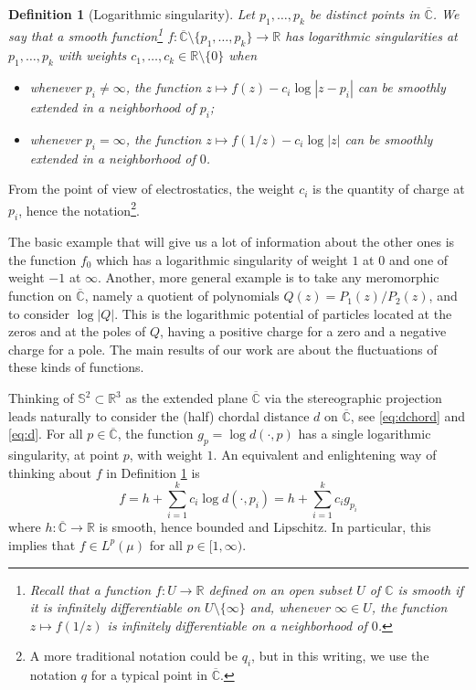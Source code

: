 \documentclass[10pt,reqno]{amsart}
\numberwithin{equation}{section}
\numberwithin{figure}{section}
\theoremstyle{plain}
\newtheorem{definition}[theorem]{Definition}
\newcommand{\<}{\langle}
\renewcommand{\>}{\rangle}
\begin{document}
\begin{definition}[Logarithmic singularity]\label{df:main:LogSing}
	Let $p_1,\dots,p_k$ be distinct points in $\overline{\mathbb C}$.
	We say that a smooth 
    function\footnote{Recall that a function
    $f: U \to \mathbb R$ 
    defined on an open subset $U$ of $\mathbb C$ is
    smooth if it is
    infinitely differentiable on $U \setminus \{\infty\}$
    and, whenever $\infty \in U$, 
    the function $z \mapsto f(1/z)$ is infinitely
    differentiable
    on a neighborhood of $0$.}
	$f:\overline{\mathbb C} \setminus \{p_1,\dots,p_k\} \to \mathbb{R}$ has logarithmic singularities at $p_1,\dots,p_k$  with weights $c_1,\dots,c_k \in \mathbb R \setminus \{0\}$ when
	\begin{itemize}
    \item whenever $p_i\neq\infty$, the function $z \mapsto f(z) - c_i\log|z-p_i|$ can be smoothly extended in a neighborhood of $p_i$;
	\item whenever $p_i=\infty$, the function $z \mapsto f(1/z) - c_i \log|z|$ can be smoothly extended in a neighborhood of $0$.
	\end{itemize}
\end{definition}

From the point of view of electrostatics, the weight $c_i$ is the quantity of charge at $p_i$, hence the notation\footnote{A more traditional notation could be $q_i$, but in this writing, we use the notation $q$ for a typical point in $\overline{\mathbb{C}}$.}. 

The basic example that will give us a lot of information about the other ones is the function $f_0$ which has a logarithmic singularity of weight $1$ at $0$ and one of weight $-1$ at $\infty$. Another, more general example is to take any meromorphic function on $\overline {\mathbb C}$, namely a quotient of polynomials $Q(z) = P_1(z)/P_2(z)$, and to consider $\log|Q|$. This is the logarithmic potential of particles located at the zeros and at the poles of $Q$, having a positive charge for a zero and a negative charge for a pole. The main results of our work are about the fluctuations of these kinds of functions.

Thinking of $\mathbb S^2\subset\mathbb{R}^3$ as the extended plane $\overline{\mathbb C}$ via the stereographic projection leads naturally to consider the (half) chordal distance $d$ on $\overline{\mathbb{C}}$, see \eqref{eq:dchord} and \eqref{eq:d}. For all $p\in\overline{\mathbb{C}}$, the function $g_p=\log d(\cdot,p)$ has a single logarithmic singularity, at point $p$, with weight $1$. An equivalent and enlightening way of thinking about $f$ in Definition \ref{df:main:LogSing} is 
\begin{equation}\label{eq:LogSingAlt}
    f=h+\sum_{i=1}^kc_i\log d(\cdot,p_i)
    =h+\sum_{i=1}^kc_ig_{p_i}
\end{equation}
where $h:\overline{\mathbb{C}}\to\mathbb{R}$ is smooth, hence bounded and Lipschitz. In particular, this implies that $f\in L^p(\mu)$ for all $p\in[1,\infty)$.
\end{document}

